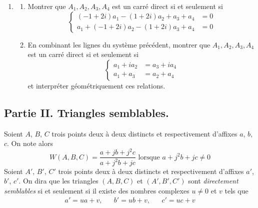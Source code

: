 \begin{enumerate}
\item 
\begin{enumerate}
 \item Montrer que $A_1, A_2, A_3, A_4$ est un carré direct si et seulement si
\begin{displaymath}
 \left\lbrace 
\begin{aligned}
 (-1+2i)a_1 - (1+2i)a_2 + a_3 + a_4 &= 0\\
 a_1 + (-1+2i)a_2 - (1+2i)a_3 + a_4  &= 0
\end{aligned}
\right. 
\end{displaymath}
\item En combinant les lignes du système précédent, montrer que $A_1, A_2, A_3, A_4$ est un carré direct si et seulement si
\begin{displaymath}
 \left\lbrace 
\begin{aligned}
 a_1 + ia_2 &=  a_3 + ia_4 \\
 a_1 + a_3 &= a_2 + a_4
\end{aligned}
\right. 
\end{displaymath}
et interpréter géométriquement ces relations.
\end{enumerate}
 \end{enumerate}

\subsection*{Partie II. Triangles semblables.}
Soient $A$, $B$, $C$ trois points deux à deux distincts et respectivement d'affixes $a$, $b$, $c$. On note alors
\begin{displaymath}
 W(A,B,C)= \frac{ a + jb +j^2c}{ a + j^2b +jc }
\text{ lorsque } a + j^2b +jc \neq 0
\end{displaymath}
Soient $A'$, $B'$, $C'$ trois points deux à deux distincts et respectivement d'affixes $a'$, $b'$, $c'$. On dira que les triangles $(A,B,C)$ et $(A',B',C')$ sont \emph{directement semblables} si et seulement si il existe des nombres complexes $u\neq 0$ et $v$ tels que
\begin{align*}
 a' = ua + v, & & b' = ub+v, & & c' = uc +v
\end{align*}

